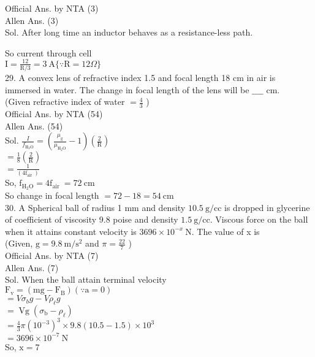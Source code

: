 \documentclass[10pt]{article}
\begin{document}
Official Ans. by NTA (3)\\
Allen Ans. (3)\\
Sol. After long time an inductor behaves as a resistance-less path.

So current through cell\\
\(\mathrm{I}=\frac{12}{\mathrm{R} / 3}=3 \mathrm{~A}\{\because \mathrm{R}=12 \Omega\}\)\\
29. A convex lens of refractive index 1.5 and focal length 18 cm in air is immersed in water. The change in focal length of the lens will be \(\_\_\_\_\) cm.\\
(Given refractive index of water \(=\frac{4}{3}\) )\\
Official Ans. by NTA (54)\\
Allen Ans. (54)\\
Sol. \(\frac{I}{f_{\mathrm{H}_{2} \mathrm{O}}}=\left(\frac{\mu_{\mathrm{g}}}{\mu_{\mathrm{H}_{2} \mathrm{O}}}-1\right)\left(\frac{2}{\mathrm{R}}\right)\)\\
\(=\frac{1}{8}\left(\frac{2}{\mathrm{R}}\right)\)\\
\(=\frac{1}{\left(4 \mathrm{f}_{\text {air }}\right)}\)\\
So, \(\mathrm{f}_{\mathrm{H}_{2} \mathrm{O}}=4 \mathrm{f}_{\text {air }}=72 \mathrm{~cm}\)\\
So change in focal length \(=72-18=54 \mathrm{~cm}\)\\
30. A Spherical ball of radius 1 mm and density \(10.5 \mathrm{~g} / \mathrm{cc}\) is dropped in glycerine of coefficient of viscosity 9.8 poise and density \(1.5 \mathrm{~g} / \mathrm{cc}\). Viscous force on the ball when it attains constant velocity is \(3696 \times 10^{-x} \mathrm{~N}\). The value of x is\\
(Given, \(\mathrm{g}=9.8 \mathrm{~m} / \mathrm{s}^{2}\) and \(\pi=\frac{22}{7}\) )\\
Official Ans. by NTA (7)\\
Allen Ans. (7)\\
Sol. When the ball attain terminal velocity\\
\(\mathrm{F}_{\mathrm{v}}=\left(\mathrm{mg}-\mathrm{F}_{\mathrm{B}}\right)(\because \mathrm{a}=0)\)\\
\(=V \sigma_{b} g-V \rho_{\ell} g\)\\
\(=\operatorname{Vg}\left(\sigma_{\mathrm{b}}-\rho_{\ell}\right)\)\\
\(=\frac{4}{3} \pi\left(10^{-3}\right)^{3} \times 9.8(10.5-1.5) \times 10^{3}\)\\
\(=3696 \times 10^{-7} \mathrm{~N}\)\\
So, \(\mathrm{x}=7\)
\end{document}
